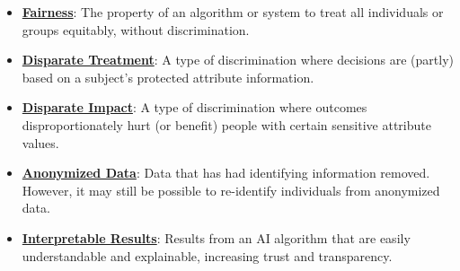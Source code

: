 \documentclass{article}%
\begin{document}
\begin{itemize}[leftmargin=*]%
\item \href{https://purdue.brightspace.com/d2l/common/assets/pdfjs-d2l-dist/1.0.14-legacy/web/viewer.html?file=\%2Fcontent\%2Fenforced\%2F1095467-wl.202510.CS.24300.001\%2F16L2-ethics.pdf\%3Fou\%3D1095467\&lang=en-us\&container=d2l-fileviewer-rendered-pdf\&fullscreen=d2l-fileviewer-rendered-pdf-dialog\&height=667#page=2}{\textbf{Fairness}}: The property of an algorithm or system to treat all individuals or groups equitably, without discrimination.%
\item \href{https://purdue.brightspace.com/d2l/common/assets/pdfjs-d2l-dist/1.0.14-legacy/web/viewer.html?file=\%2Fcontent\%2Fenforced\%2F1095467-wl.202510.CS.24300.001\%2F16L2-ethics.pdf\%3Fou\%3D1095467\&lang=en-us\&container=d2l-fileviewer-rendered-pdf\&fullscreen=d2l-fileviewer-rendered-pdf-dialog\&height=667#page=19}{\textbf{Disparate Treatment}}: A type of discrimination where decisions are (partly) based on a subject's protected attribute information.%
\item \href{https://purdue.brightspace.com/d2l/common/assets/pdfjs-d2l-dist/1.0.14-legacy/web/viewer.html?file=\%2Fcontent\%2Fenforced\%2F1095467-wl.202510.CS.24300.001\%2F16L2-ethics.pdf\%3Fou\%3D1095467\&lang=en-us\&container=d2l-fileviewer-rendered-pdf\&fullscreen=d2l-fileviewer-rendered-pdf-dialog\&height=667#page=19}{\textbf{Disparate Impact}}: A type of discrimination where outcomes disproportionately hurt (or benefit) people with certain sensitive attribute values.%
\item \href{https://purdue.brightspace.com/d2l/common/assets/pdfjs-d2l-dist/1.0.14-legacy/web/viewer.html?file=\%2Fcontent\%2Fenforced\%2F1095467-wl.202510.CS.24300.001\%2F16L2-ethics.pdf\%3Fou\%3D1095467\&lang=en-us\&container=d2l-fileviewer-rendered-pdf\&fullscreen=d2l-fileviewer-rendered-pdf-dialog\&height=667#page=10}{\textbf{Anonymized Data}}: Data that has had identifying information removed. However, it may still be possible to re-identify individuals from anonymized data.%
\item \href{https://purdue.brightspace.com/d2l/common/assets/pdfjs-d2l-dist/1.0.14-legacy/web/viewer.html?file=\%2Fcontent\%2Fenforced\%2F1095467-wl.202510.CS.24300.001\%2F16L2-ethics.pdf\%3Fou\%3D1095467\&lang=en-us\&container=d2l-fileviewer-rendered-pdf\&fullscreen=d2l-fileviewer-rendered-pdf-dialog\&height=667#page=28}{\textbf{Interpretable Results}}: Results from an AI algorithm that are easily understandable and explainable, increasing trust and transparency.%

\end{itemize}
\end{document}
